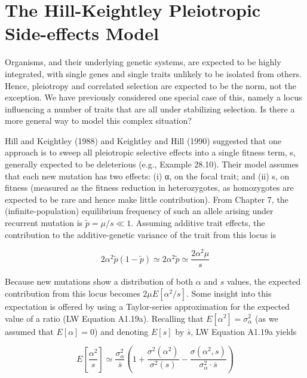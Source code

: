 \documentclass{article}
\begin{document}
\section{The Hill-Keightley Pleiotropic Side-effects Model}
Organisms, and their underlying genetic systems, are expected to be highly integrated, with single genes and single traits unlikely to be isolated from others. Hence, pleiotropy and correlated selection are expected to be the norm, not the exception. We have previously considered one special case of this, namely a locus influencing a number of traits that are all under stabilizing selection. Is there a more general way to model this complex situation?

Hill and Keightley (1988) and Keightley and Hill (1990) suggested that one approach is to sweep all pleiotropic selective effects into a single fitness term, s, generally expected to be deleterious (e.g., Example 28.10). Their model assumes that each new mutation has two effects: (i) α, on the focal trait; and (ii) s, on fitness (measured as the fitness reduction in heterozygotes, as homozygotes are expected to be rare and hence make little contribution). From Chapter 7, the (infinite-population) equilibrium frequency of such an allele arising under recurrent mutation is  $ \tilde{p} = \mu / s \ll 1 $. Assuming additive trait effects, the contribution to the additive-genetic variance of the trait from this locus is

\begin{equation}
2\alpha^{2}\widetilde{p}(1-\widetilde{p})\simeq2\alpha^{2}\widetilde{p}\simeq\frac{2\alpha^{2}\mu}{s}
\tag{28.44a}
\label{eq:28_44a}
\end{equation}

Because new mutations show a distribution of both $\alpha$ and $s$ values, the expected contribution from this locus becomes $2\mu E[\alpha^2/s]$. Some insight into this expectation is offered by using a Taylor-series approximation for the expected value of a ratio (LW Equation A1.19a). Recalling that $E[\alpha^2] = \sigma_\alpha^2$ (as we assumed that $E[\alpha] = 0$) and denoting $E[s]$ by $\bar{s}$, LW Equation A1.19a yields

\begin{equation}
E\left[\frac{\alpha^{2}}{s}\right]\simeq\frac{\sigma_{\alpha}^{2}}{\overline{s}}\left(1+\frac{\sigma^{2}(\alpha^{2})}{\sigma^{2}(s)}-\frac{\sigma(\alpha^{2},s)}{\sigma_{\alpha}^{2}\cdot\overline{s}}\right)
\tag{28.44b}
\label{eq:28_44b}
\end{equation}
\end{document}
